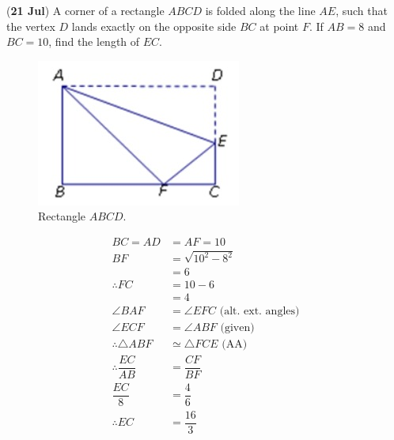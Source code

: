 \documentclass[12pt,answers]{exam}
\renewcommand{\frac}[2]{\dfrac{#1}{#2}}
\newcommand{\qndate}[2]{(\textbf{#1 #2})}
\begin{document}
\begin{questions}
  \question \qndate{21}{Jul} A corner of a rectangle $ABCD$ is folded
  along the line $AE$,
  such that the vertex $D$ lands exactly on the opposite side $BC$ at point $F$.
  If $AB=8$ and $BC=10$, find the length of $EC$.
  \begin{figure}[htpb]
    \centering
    \includegraphics[scale=.6]{images/0721_Tri.jpeg}
    \caption{Rectangle $ABCD$.}
    \label{fig:0721_Tri}
  \end{figure}
  \begin{solution}
    \begin{align*}
      BC = AD                  & = AF = 10                               \\
      BF                       & = \sqrt{{10}^2-8^2}                     \\
      & = 6                                     \\
      \therefore FC            & = 10 - 6                                \\
      & = 4                                     \\
      \angle BAF               & = \angle EFC \text{ (alt. ext. angles)} \\
      \angle ECF               & = \angle ABF \text{ (given)}            \\
      \therefore \triangle ABF & \simeq \triangle FCE \text{ (AA)}       \\
      \therefore \frac{EC}{AB} & = \frac{CF}{BF}                         \\
      \frac{EC}{8}             & = \frac{4}{6}                           \\
      \therefore EC            & = \frac{16}{3}
    \end{align*}
  \end{solution}


\end{questions}
\end{document}
